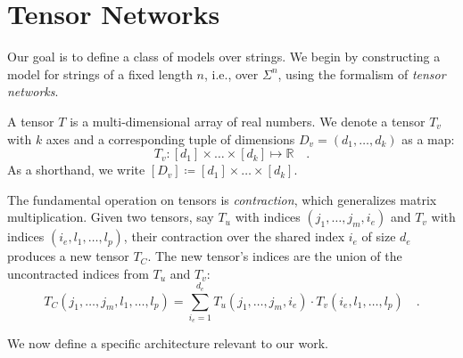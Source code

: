 \documentclass[../../main.tex]{subfiles}
\begin{document}





\section{Tensor Networks}
\label{section:tensor_networks}
Our goal is to define a class of models over strings. We begin by constructing a model for strings of a fixed length \( n \), i.e., over \( \Sigma^n \), using the formalism of \emph{tensor networks}.

\bigskip
A tensor \( T \) is a multi-dimensional array of real numbers. We denote a tensor \( T_v \) with \( k \) axes and a corresponding tuple of dimensions \( D_v = (d_1, \dots, d_k) \) as a map:
\[
T_v : [d_1] \times \dots \times [d_k] \mapsto \mathbb{R} \quad .
\]
As a shorthand, we write \( [D_v] \coloneqq [d_1] \times \dots \times [d_k] \).

The fundamental operation on tensors is \emph{contraction}, which generalizes matrix multiplication. Given two tensors, say \( T_u \) with indices \( (j_1, \dots, j_m, i_e) \) and \( T_v \) with indices \( (i_e, l_1, \dots, l_p) \), their contraction over the shared index \( i_e \) of size \( d_e \) produces a new tensor \( T_C \). The new tensor's indices are the union of the uncontracted indices from \( T_u \) and \( T_v \):
\[
T_C(j_1, \dots, j_m, l_1, \dots, l_p) = \sum_{i_e=1}^{d_e} T_u(j_1, \dots, j_m, i_e) \cdot T_v(i_e, l_1, \dots, l_p) \quad .
\]

We now define a specific architecture relevant to our work.
\end{document}
